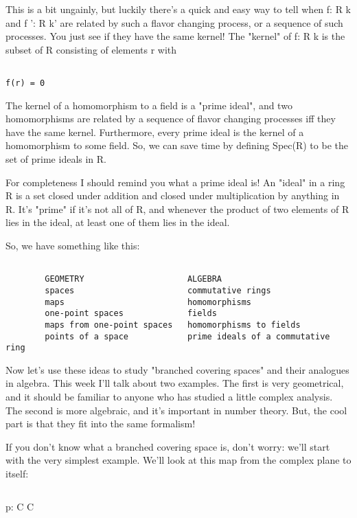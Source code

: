 This is a bit ungainly, but luckily there's a quick and easy way to tell 
when f: R \to  k and f ': R \to  k' are related by such a flavor changing 
process, or a sequence of such processes.  You just see if they have
the same kernel!  The "kernel" of f: R \to  k is the subset of R 
consisting of elements r with 


\begin{verbatim}

f(r) = 0
\end{verbatim}
    
The kernel of a homomorphism to a field is a "prime ideal", and two
homomorphisms are related by a sequence of flavor changing processes
iff they have the same kernel.  Furthermore, every prime ideal is
the kernel of a homomorphism to some field.  So, we can save time by
defining Spec(R) to be the set of prime ideals in R.  

For completeness I should remind you what a prime ideal is!  An 
"ideal" 
in a ring R is a set closed under addition and closed under multiplication 
by anything in R.  It's "prime" if it's not all of R, and whenever 
the product of two elements of R lies in the ideal, at least one of them 
lies in the ideal.  

So, we have something like this:


\begin{verbatim}

        GEOMETRY                     ALGEBRA
        spaces                       commutative rings
        maps                         homomorphisms
        one-point spaces             fields
        maps from one-point spaces   homomorphisms to fields
        points of a space            prime ideals of a commutative ring
\end{verbatim}
    
Now let's use these ideas to study "branched covering spaces" and 
their analogues in algebra.  This week I'll talk about two examples.  The first
is very geometrical, and it should be familiar to anyone who has studied 
a little complex analysis.   The second is more algebraic, and it's 
important in number theory.  But, the cool part is that they fit into 
the same formalism!

If you don't know what a branched covering space is, don't worry:
we'll start with the very simplest example.  We'll look at this map from 
the complex plane to itself:


$$

p: C \to  C

